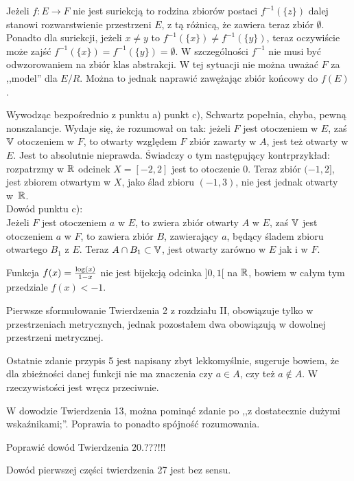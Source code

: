 \documentclass[a4paper,11pt]{article}
\newcommand{\V}{\mb{V}}
\newcommand{\ra}{\rightarrow}
\begin{document}
\start {} Jeżeli $f : E \ra F$ nie jest suriekcją to rodzina
zbiorów postaci $f^{ -1 } ( \{ z\} )$ dalej stanowi rozwarstwienie
przestrzeni $E$, z tą różnicą, że zawiera teraz zbiór $\emptyset$.
Ponadto dla suriekcji, jeżeli $x \neq y$ to
$f^{ -1 }( \{ x \} ) \neq f^{ -1 } ( \{ y\} )$, teraz oczywiście może
zajść $f^{ -1 }( \{ x \} ) = f^{ -1 }( \{ y \} ) = \emptyset$. W
szczególności $f^{ -1 }$ nie musi być odwzorowaniem na zbiór klas
abstrakcji. W tej sytuacji nie można uważać $F$ za ,,model'' dla
$E / R$. Można to jednak naprawić zawężając zbiór końcowy do $f( E )$.

\start {} Wywodząc bezpośrednio z punktu a) punkt c), Schwartz
popełnia, chyba, pewną nonszalancje. Wydaje się, że rozumował on tak:
jeżeli $F$ jest otoczeniem w $E$, zaś $\V$ otoczeniem w $F$, to
otwarty względem $F$ zbiór zawarty w $A$, jest też otwarty w $E$. Jest
to absolutnie nieprawda. Świadczy o tym następujący kontrprzykład:
rozpatrzmy w $\mathbb{R}$ odcinek $X = [ -2, 2 ]$ jest to otoczenie 0. Teraz
zbiór $( -1, 2 ]$, jest zbiorem otwartym
w $X$, jako ślad zbioru $( -1, 3 )$, nie jest jednak otwarty w~$\mathbb{R}$.\\
Dowód punktu c):\\
Jeżeli $F$ jest otoczeniem $a$ w $E$, to zwiera zbiór otwarty $A$ w
$E$, zaś $\V$ jest otoczeniem $a$ w $F$, to zawiera zbiór $B$,
zawierający $a$, będący śladem zbioru otwartego $B_{ 1 }$ z $E$. Teraz
$A \cap B_{ 1 } \subset \V$, jest otwarty zarówno w $E$ jak i w $F$.

\start {} Funkcja $f( x ) = \frac{ \log( x ) }{ 1 - x }$ nie jest
bijekcją odcinka $] 0, 1 [$ na $\mathbb{R}$, bowiem w całym tym przedziale
$f( x ) < -1$.

\start {} Pierwsze sformułowanie Twierdzenia 2 z rozdziału II,
obowiązuje tylko w przestrzeniach metrycznych, jednak pozostałem dwa
obowiązują w dowolnej przestrzeni metrycznej.

\start {} Ostatnie zdanie przypis 5 jest napisany zbyt
lekkomyślnie, sugeruje bowiem, że dla zbieżności danej funkcji nie ma
znaczenia czy $a \in A$, czy też $a \notin A$. W rzeczywistości jest
wręcz przeciwnie.
  
\start {} W dowodzie Twierdzenia 13, można pominąć zdanie po ,,z
dostatecznie dużymi wskaźnikami;''. Poprawia to ponadto spójność
rozumowania.
  
\start {} Poprawić dowód Twierdzenia 20.???!!!

\start {} Dowód pierwszej części twierdzenia 27 jest bez sensu.
\end{document}
